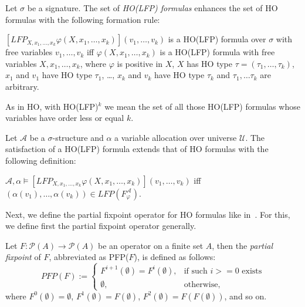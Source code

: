 \begin{definition}
    Let $\sigma$ be a signature. The set of \emph{HO(LFP) formulas} enhances the set of HO formulas with the
    following formation rule:
    \begin{compactitem}
        \item $[LFP_{X, x_1, \dots, x_k}\varphi(X, x_1, \dots, x_k)](v_1, \dots, v_k)$ is a HO(LFP) formula over
        $\sigma$ with free variables $v_1, \dots, v_k$ iff $\varphi(X, x_1, \dots, x_k)$ is a HO(LFP) formula with
        free variables $X, x_1, \dots, x_k$, where $\varphi$ is positive in $X$, $X$ has HO type $\tau = (\tau_1,
        \dots, \tau_k)$, $x_1$ and $v_1$ have HO type $\tau_1$, \dots, $x_k$ and $v_k$ have HO type $\tau_k$ and
        $\tau_1, \dots \tau_k$ are arbitrary.
    \end{compactitem}
\end{definition}

As in HO, with HO(LFP)$^k$ we mean the set of all those HO(LFP) formulas whose variables have order less or equal $k$.

\begin{definition}
    Let $\mathcal{A}$ be a $\sigma$-structure and $\alpha$ a variable allocation over universe $\mathcal{U}$. The
    satisfaction of a HO(LFP) formula extends that of HO formulas with the following definition:
    \begin{compactitem}
        \item $\mathcal{A}, \alpha \models [LFP_{X, x_1, \dots, x_k}\varphi(X, x_1, \dots, x_k)](v_1, \dots, v_k)$
        iff $(\alpha(v_1), \dots, \alpha(v_k)) \in LFP(F_\varphi^\mathcal{A})$.
    \end{compactitem}
\end{definition}

Next, we define the partial fixpoint operator for HO formulas like in~\cite{schewe2006fixpoint}. For this, we define
first the partial fixpoint operator generally.

\begin{definition}
    Let $F: \mathscr{P}(A) \rightarrow \mathscr{P}(A)$ be an operator on a finite set $A$, then the \emph{partial
    fixpoint} of $F$, abbreviated as PFP($F$), is defined as follows:
    \[PFP(F):=\begin{cases}
               F^{i+1}(\emptyset)=F^i(\emptyset),  & \text{if such } i >= 0 \text{ exists}\\
               \emptyset, & \text{otherwise,}
    \end{cases}\]
    where $F^0(\emptyset) = \emptyset$, $F^1(\emptyset) = F(\emptyset)$, $F^2(\emptyset) = F(F(\emptyset))$, and so on.
\end{definition}

